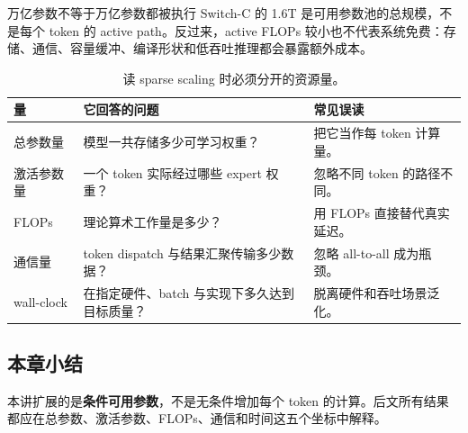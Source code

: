 \begin{warningbox}{万亿参数不等于万亿参数都被执行}
Switch-C 的 1.6T 是可用参数池的总规模，不是每个 token 的 active path。反过来，active FLOPs 较小也不代表系统免费：存储、通信、容量缓冲、编译形状和低吞吐推理都会暴露额外成本。
\end{warningbox}

\begin{table}[H]
\centering
\small
\caption{读 sparse scaling 时必须分开的资源量。}
\begin{tabularx}{\textwidth}{L{0.22\textwidth}X X}
\toprule
量 & 它回答的问题 & 常见误读 \\
\midrule
总参数量 & 模型一共存储多少可学习权重？ & 把它当作每 token 计算量。 \\
激活参数量 & 一个 token 实际经过哪些 expert 权重？ & 忽略不同 token 的路径不同。 \\
FLOPs & 理论算术工作量是多少？ & 用 FLOPs 直接替代真实延迟。 \\
通信量 & token dispatch 与结果汇聚传输多少数据？ & 忽略 all-to-all 成为瓶颈。 \\
wall-clock & 在指定硬件、batch 与实现下多久达到目标质量？ & 脱离硬件和吞吐场景泛化。 \\
\bottomrule
\end{tabularx}
\end{table}

\subsection{本章小结}

本讲扩展的是\textbf{条件可用参数}，不是无条件增加每个 token 的计算。后文所有结果都应在总参数、激活参数、FLOPs、通信和时间这五个坐标中解释。

